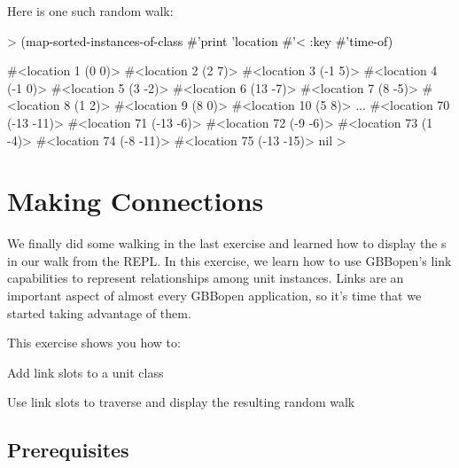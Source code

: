 \documentclass[10pt,twoside,english,pdftex]{article}
\begin{document}
%
Here is one such random walk:
%
\begin{example}\color{darkergray}%
  > \textcolor{black}{(map-sorted-instances-of-class #'print 'location #'< 
       :key #'time-of)}

  #<location 1 (0 0)> 
  #<location 2 (2 7)> 
  #<location 3 (-1 5)> 
  #<location 4 (-1 0)> 
  #<location 5 (3 -2)> 
  #<location 6 (13 -7)> 
  #<location 7 (8 -5)> 
  #<location 8 (1 2)> 
  #<location 9 (8 0)> 
  #<location 10 (5 8)> 
       ...
  #<location 70 (-13 -11)> 
  #<location 71 (-13 -6)> 
  #<location 72 (-9 -6)> 
  #<location 73 (1 -4)> 
  #<location 74 (-8 -11)> 
  #<location 75 (-13 -15)> 
  nil
  >
\end{example}


\T\markright{}%
\T\pagestyle{plain}
\T\cleardoublepage
\W{}
\T\pagestyle{fancy}
\T\thispagestyle{fancybottom}
\T\renewcommand{\headrulewidth}{0pt}
\section{Making Connections}
\label{sec:connections}%


We finally did some walking in the last exercise and learned how to display
the s in our walk from the REPL.  In this exercise, we learn
how to use GBBopen's link capabilities to represent relationships among unit
instances.  Links are an important aspect of almost every GBBopen application,
so it's time that we started taking advantage of them.

\fndocrule

This exercise shows you how to:
\begin{tightitemize}
\item Add link slots to a unit class
\item Use link slots to traverse and display the resulting random walk
\end{tightitemize}

\fndocrule

\subsection*{Prerequisites}
\end{document}
